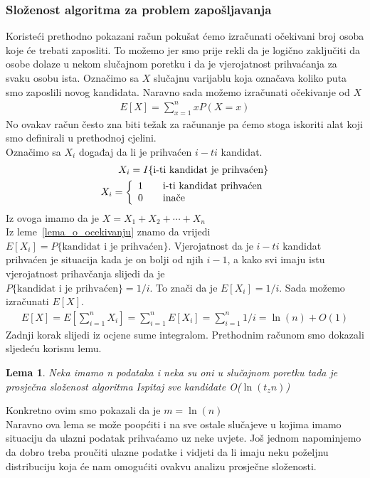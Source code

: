\documentclass[10pt,a4paper]{article}
\newtheorem{lema}{Lema}
\begin{document}
\subsubsection{Složenost algoritma za problem zapošljavanja}
Koristeći prethodno pokazani račun pokušat ćemo izračunati očekivani broj osoba koje će trebati zaposliti. To možemo jer smo 
prije rekli da je logično zaključiti da osobe dolaze u nekom slučajnom poretku i da je vjerojatnost prihvaćanja za svaku osobu ista.
Označimo sa $X$ slučajnu varijablu koja označava koliko puta smo zaposlili novog kandidata. Naravno sada možemo izračunati očekivanje od $X$
\begin{align*}
E[X] = \sum_{x=1}^{n}xP(X=x)
\end{align*}
No ovakav račun često zna biti težak za računanje pa ćemo stoga iskoriti alat koji smo definirali u prethodnoj cjelini.\\
Označimo sa $X_i$ događaj da li je prihvaćen $i-ti$ kandidat.
\begin{align*}
X_i = I\{\text{i-ti kandidat je prihvaćen}\}\\
X_i = \left\{ 
  \begin{array}{l l}
    1 & \quad \text{i-ti kandidat prihvaćen}\\
    0 & \quad \text{inače}
  \end{array} \right.
\end{align*}
Iz ovoga imamo da je $X = X_1 + X_2 + \cdots + X_n$\\
Iz leme~\ref{lema_o_ocekivanju} znamo da vrijedi $E[X_i] = P\{\text{kandidat i je prihvaćen}\}$.
Vjerojatnost da je $i-ti$ kandidat prihvaćen je situacija kada je on bolji od njih $i-1$, a kako svi imaju istu vjerojatnost prihavčanja slijedi da je
\\$P\{\text{kandidat i je prihvaćen}\}=1/i$. To znači da je $E[X_i] = 1/i$. Sada možemo izračunati $E[X]$.
\begin{align*}
E[X] = E[\sum_{i = 1}^{n}X_i] = \sum_{i = 1}^{n}E[X_i] = \sum_{i = 1}^{n}1/i = \ln(n) + O(1)
\end{align*}
Zadnji korak slijedi iz ocjene sume integralom.
Prethodnim računom smo dokazali sljedeću korisnu lemu.
\begin{lema}\label{slozenost_rand_alg}
Neka imamo n podataka i neka su oni u slučajnom poretku tada je prosječna složenost algoritma Ispitaj sve kandidate O($\ln(t_zn)$)  
\end{lema}
Konkretno ovim smo pokazali da je $m = \ln(n)$\\
Naravno ova lema se može poopćiti i na sve ostale slučajeve u kojima imamo situaciju da ulazni podatak prihvaćamo uz neke uvjete. 
Još jednom napominjemo da dobro treba proučiti ulazne podatke i vidjeti da li imaju neku poželjnu distribuciju koja će nam omogućiti ovakvu analizu prosječne složenosti.
\end{document}
